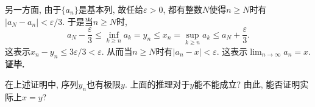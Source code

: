 另一方面, 由于$\{a_n\}$是基本列, 故任给$\varepsilon>0$, 都有整数$N$使得$n\geq N$时有$|a_N-a_n|<\varepsilon/3$. 于是当$n\geq N$时,
$$
a_N-\frac{\varepsilon}{3}\leq \inf_{k\geq n}a_k=y_n
\leq x_n=\sup_{k\geq n}a_k\leq a_N+\frac{\varepsilon}{3}.
$$
这表示$x_n-y_n\leq 3\varepsilon/3<\varepsilon$. 从而当$n\geq N$时有$|a_n-x|<\varepsilon$. 这表示$\lim_{n\to\infty}a_n=x$.\textbf{证毕.}

\begin{exercise}{}
在上述证明中, 序列$y_n$也有极限$y$. 上面的推理对于$y$能不能成立? 由此, 能否证明实际上$x=y$?
\end{exercise}

